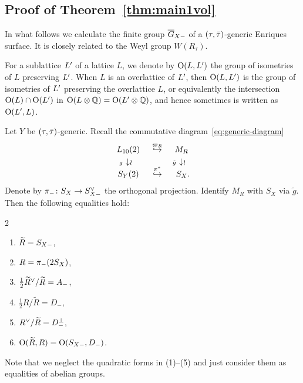 \documentclass{amsart}
\numberwithin{procedure}{section}
\newcommand{\rl}{R}
\newcommand{\trl}{\widetilde{\rl}}
\begin{document}
\subsection{Proof of Theorem~\ref{thm:main1vol}}\label{subsec:GXmWR}
%
In what follows we calculate the finite group $\overline{G}_{X-}$
of a $(\tau, \bar{\tau})$-generic Enriques surface. It is
closely related to the Weyl group $W(R_{\tau})$.
\par
For a sublattice $L\sp\prime$ of a lattice $L$,  we denote by 
$\mathord{\mathrm{O}}(L, L\sp\prime)$  the group 
of isometries of $L$ preserving $L\sp\prime$.
When $L$ is an overlattice of $L\sp\prime$,
then  $\mathord{\mathrm{O}}(L, L\sp\prime)$ is 
the group 
of isometries of $L\sp\prime$ preserving the overlattice $L$,
or equivalently the intersection $\mathord{\mathrm{O}}(L)\cap \mathord{\mathrm{O}}(L\sp\prime)$ 
in $\mathord{\mathrm{O}}(L\otimes \mathord{\mathbb Q})=\mathord{\mathrm{O}}(L\sp\prime\otimes \mathord{\mathbb Q})$,
and hence sometimes is written as $\mathord{\mathrm{O}}(L\sp\prime, L)$.
%
\par
\begin{lemma}\label{lem:dict}
Let $Y$ be $(\tau,\bar{\tau})$-generic.
Recall the commutative diagram~\eqref{eq:generic-diagram}
\[
\begin{array}{ccc}
\Lten (2) &\maprightinjsp{\embLM_R}  & M_R
\mystruth{12pt} \\
\llap{\scriptsize $g$\;}\downisom &&  \llap{\scriptsize $\tilde{g}$\;}\downisom \\
S_Y(2) &\maprightinjsp{\pi^*} & S_X \rlap{.}
\end{array}
\]
Denote by
$\pi_-\colon S_{X} \rightarrow S_{X-}\sp{\vee} $ the orthogonal projection.
Identify $M_R$ with $S_X$ via $\tilde{g}$. 
Then the following equalities hold:
\begin{multicols}{2}
\begin{enumerate}[{\rm (1)}] 
 \item $\trl = \SXm$,
 \item $\rl = \pi_-(2 \SX)$,
 \item $\tfrac{1}{2}\trl\dual  / \trl=A_- $, 
 \item $\tfrac{1}{2}\rl / \trl = D_{-}$,
 \item $\rl\dual  / \trl=D_{-}^\perp $,
 \item $\OG(\trl,\rl)=\OG(\SXm,D_-)$.
\end{enumerate}
\end{multicols}
Note that we neglect the quadratic forms in {\rm (1)--(5)}
and just consider them as equalities of abelian groups.
\end{lemma}
\end{document}
